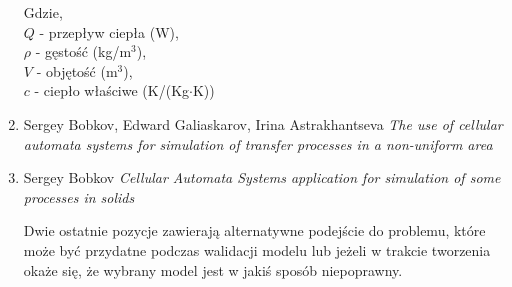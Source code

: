 \documentclass{article}
\begin{document}
\begin{enumerate}
    Gdzie, \\
    $Q$ - przepływ ciepła (W), \\
    $\rho$ - gęstość (kg/m$^3$), \\
    $V$ - objętość (m$^3$), \\
    $c$ - ciepło właściwe (K/(Kg$\cdot$K))

    \item
    Sergey Bobkov, Edward Galiaskarov, Irina Astrakhantseva \textit{The use of cellular automata systems for
    simulation of transfer processes in a non-uniform area}

    \item
    Sergey Bobkov \textit{Cellular Automata Systems application for simulation of some processes in solids}

    Dwie ostatnie pozycje zawierają alternatywne podejście do problemu, które może być przydatne podczas walidacji modelu lub
    jeżeli w trakcie tworzenia okaże się, że wybrany model jest w jakiś sposób niepoprawny.
\end{enumerate}
\end{document}
